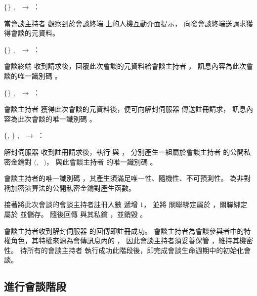 \begin{pmsgsi}
    \item $\{\}$ $,~$ \DEFowner $\rightarrow$ \DEFmeetingbox：

        當會談主持者 \DEFowner 觀察到於會談終端 \DEFmeetingbox 上的人機互動介面提示，
    向發會談終端送請求獲得會談的元資料。

    \item $\{$\DEFsessionID$\}$ $,~$ \DEFmeetingbox $\rightarrow$ \DEFowner：

        會談終端 \DEFmeetingbox 收到請求後，回覆此次會談的元資料給會談主持者 \DEFowner，
    訊息內容為此次會談的唯一識別碼 \DEFsessionID。

    \item $\{$\DEFsessionID$\}$ $,~$ \DEFowner $\rightarrow$ \DEFserver：

        會談主持者 \DEFowner 獲得此次會談的元資料後，便可向解封伺服器 \DEFserver 傳送註冊請求，
    訊息內容為此次會談的唯一識別碼 \DEFsessionID。

    \item $\{$\DEFownerID, \DEFprivateKey$\}$ $,~$ \DEFserver $\rightarrow$ \DEFowner：

        解封伺服器 \DEFserver 收到註冊請求後，執行 \DEFfuncPKgen{} 與 \DEFfuncIDgen{}，
    分別產生一組屬於會談主持者 \DEFowner 的公開私密金鑰對 $($\DEFpublicKey$,~$ \DEFprivateKey$)$，
    與此會談主持者 \DEFowner 的唯一識別碼 \DEFownerID。

        會談主持者的唯一識別碼 \DEFownerID，其產生須滿足唯一性、隨機性、不可預測性。
    \DEFfuncPKgen{} 為非對稱加密演算法的公開私密金鑰對產生函數。

        接著將此次會談的會談主持者註冊人數 \DEFowreg 遞增 $1$，
    並將 \DEFownerID 關聯綁定屬於 \DEFsessionID，\DEFpublicKey 關聯綁定屬於 \DEFownerID 並儲存。
    隨後回傳 \DEFownerID 與其私鑰 \DEFprivateKey，並銷毀 \DEFprivateKey。

        會談主持者收到解封伺服器 \DEFserver 的回傳即註冊成功。
    會談主持者為會談參與者中的特權角色，其特權來源為會傳訊息內的 \DEFprivateKey，
    因此會談主持者須妥善保管 \DEFprivateKey，維持其機密性。
    待所有的會談主持者 \DEFownerAll 執行成功此階段後，即完成會談生命週期中的初始化會談。
\end{pmsgsi}


\subsection{進行會談階段}\label{subsec:protocol-sessioning}

